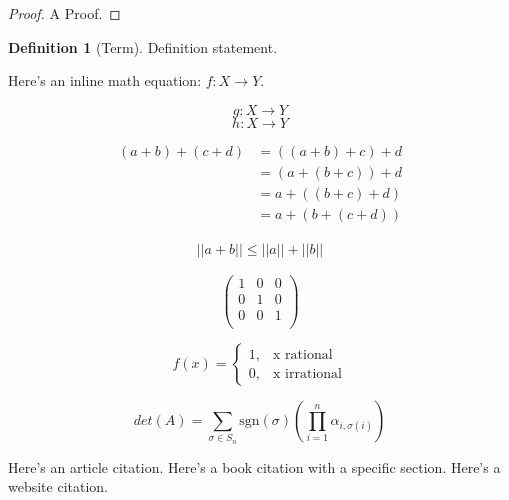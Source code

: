 \documentclass[11pt, reqno]{amsart}
\theoremstyle{plain}
\theoremstyle{definition}
\newtheorem*{defn}{Definition}
\theoremstyle{example}
\begin{document}
\begin{proof}
	A Proof.
\end{proof}

\begin{defn}[Term]
	Definition statement.
\end{defn}



Here's an inline math equation: $f: X \rightarrow Y$. 

$$g: X \rightarrow Y$$
\[h: X \rightarrow Y\]

\begin{align*}
  (a + b) + (c + d) &= ((a + b) + c) + d \\
  &= (a + (b + c)) + d \\ 
  &= a + ((b + c) + d) \\ 
  &= a + (b + (c + d)) 
\end{align*}

\begin{align}
	||a+b|| \leq ||a|| + ||b||
\end{align}

\[\begin{pmatrix}
	1 & 0 & 0 \\ 
	0 & 1 & 0 \\ 
	0 & 0 & 1 \\
\end{pmatrix}\]

\[ f(x) = 
\begin{cases} 
	1, &\text{x rational } \\
	0, &\text{x irrational}	
\end{cases}
\]

\[det(A) = \sum_{\sigma \in S_n}\text{sgn}(\sigma)\left(\prod_{i=1}^n \alpha_{i, \sigma(i)}\right)\]

Here's an article citation. \cite{vershik}
Here's a book citation with a specific section. \cite[\S 1.1]{riehl}
Here's a website citation. \cite{wiki-tensor}

\printbibliography


\end{document}
